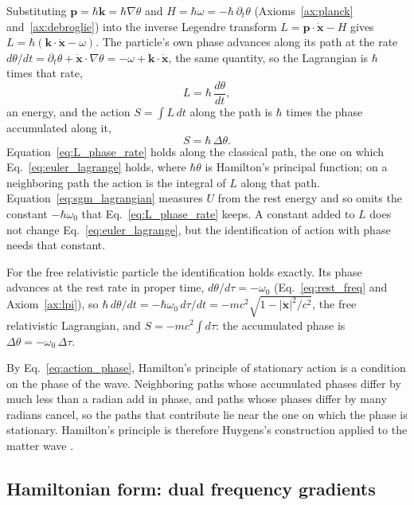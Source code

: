 \documentclass[aps,prd,onecolumn,tightenlines,nofootinbib,notitlepage,11pt,floatfix]{revtex4-2}
\theoremstyle{indentedtheorem}
\begin{document}
Substituting $\mathbf{p}=\hbar\mathbf{k}=\hbar\nabla\theta$ and $H=\hbar\omega=-\hbar\,\partial_t\theta$ (Axioms~\ref{ax:planck} and~\ref{ax:debroglie}) into the inverse Legendre transform $L=\mathbf{p}\cdot\dot{\mathbf{x}}-H$ gives $L=\hbar(\mathbf{k}\cdot\dot{\mathbf{x}}-\omega)$. The particle's own phase advances along its path at the rate $d\theta/dt=\partial_t\theta+\dot{\mathbf{x}}\cdot\nabla\theta=-\omega+\mathbf{k}\cdot\dot{\mathbf{x}}$, the same quantity, so the Lagrangian is $\hbar$ times that rate,
\begin{equation}
    L = \hbar\,\frac{d\theta}{dt} ,
    \label{eq:L_phase_rate}
\end{equation}
an energy, and the action $S=\int L\,dt$ along the path is $\hbar$ times the phase accumulated along it,
\begin{equation}
    S = \hbar\,\Delta\theta .
    \label{eq:action_phase}
\end{equation}
Equation~\eqref{eq:L_phase_rate} holds along the classical path, the one on which Eq.~\eqref{eq:euler_lagrange} holds, where $\hbar\theta$ is Hamilton's principal function; on a neighboring path the action is the integral of $L$ along that path. Equation~\eqref{eq:sgm_lagrangian} measures $U$ from the rest energy and so omits the constant $-\hbar\omega_0$ that Eq.~\eqref{eq:L_phase_rate} keeps. A constant added to $L$ does not change Eq.~\eqref{eq:euler_lagrange}, but the identification of action with phase needs that constant.

For the free relativistic particle the identification holds exactly. Its phase advances at the rest rate in proper time, $d\theta/d\tau=-\omega_0$ (Eq.~\eqref{eq:rest_freq} and Axiom~\ref{ax:lpi}), so $\hbar\,d\theta/dt=-\hbar\omega_0\,d\tau/dt=-mc^2\sqrt{1-|\dot{\mathbf{x}}|^2/c^2}$, the free relativistic Lagrangian, and $S=-mc^2\!\int d\tau$: the accumulated phase is $\Delta\theta=-\omega_0\,\Delta\tau$.

By Eq.~\eqref{eq:action_phase}, Hamilton's principle of stationary action is a condition on the phase of the wave. Neighboring paths whose accumulated phases differ by much less than a radian add in phase, and paths whose phases differ by many radians cancel, so the paths that contribute lie near the one on which the phase is stationary. Hamilton's principle is therefore Huygens's construction applied to the matter wave \citep{Huygens1690Traite,Schrodinger1926Quantization}.

\subsection{Hamiltonian form: dual frequency gradients}
\label{sec:hamiltonian}
\end{document}
